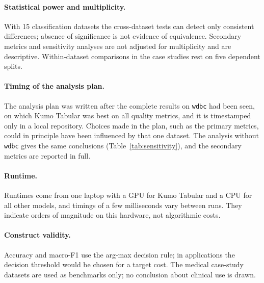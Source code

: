 \paragraph{Statistical power and multiplicity.}
With 15 classification datasets the cross-dataset tests can detect only consistent differences; absence of
significance is not evidence of equivalence. Secondary metrics and sensitivity analyses are not adjusted for
multiplicity and are descriptive. Within-dataset comparisons in the case studies rest on five dependent splits.

\paragraph{Timing of the analysis plan.}
The analysis plan was written after the complete results on \texttt{wdbc} had been seen, on which Kumo Tabular was best
on all quality metrics, and it is timestamped only in a local repository. Choices made in the plan, such as the
primary metrics, could in principle have been influenced by that one dataset. The analysis without \texttt{wdbc}
gives the same conclusions (Table~\ref{tab:sensitivity}), and the secondary metrics are reported in full.

\paragraph{Runtime.}
Runtimes come from one laptop with a GPU for Kumo Tabular and a CPU for all other models, and timings of a few
milliseconds vary between runs. They indicate orders of magnitude on this hardware, not algorithmic costs.

\paragraph{Construct validity.}
Accuracy and macro-F1 use the arg-max decision rule; in applications the decision threshold would be chosen for a
target cost. The medical case-study datasets are used as benchmarks only; no conclusion about clinical use is drawn.
